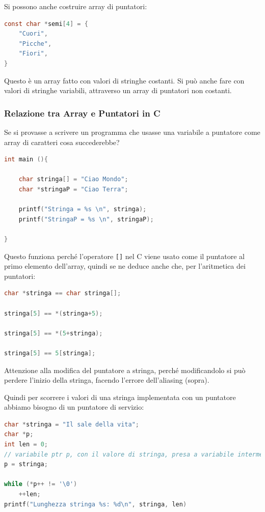 \documentclass[
  paper=a4,
  oneside  ,captions=tableheading
]{scrbook}
\newcommand{\passthrough}[1]{#1}
\begin{document}
Si possono anche costruire array di puntatori:

\begin{lstlisting}[language=C]
const char *semi[4] = {
    "Cuori",
    "Picche",
    "Fiori",
}
\end{lstlisting}

Questo è un array fatto con valori di stringhe costanti. Si può anche
fare con valori di stringhe variabili, attraverso un array di puntatori
non costanti.

\hypertarget{relazione-tra-array-e-puntatori-in-c}{%
\subsubsection{Relazione tra Array e Puntatori in
C}\label{relazione-tra-array-e-puntatori-in-c}}

Se si provasse a scrivere un programma che usasse una variabile a
puntatore come array di caratteri cosa succederebbe?

\begin{lstlisting}[language=C]
int main (){
    
    char stringa[] = "Ciao Mondo";
    char *stringaP = "Ciao Terra";
    
    printf("Stringa = %s \n", stringa);
    printf("StringaP = %s \n", stringaP);
    
}
\end{lstlisting}

Questo funziona perché l'operatore \passthrough{\lstinline![]!} nel C
viene usato come il puntatore al primo elemento dell'array, quindi se ne
deduce anche che, per l'aritmetica dei puntatori:

\begin{lstlisting}[language=C]
char *stringa == char stringa[];

stringa[5] == *(stringa+5);

stringa[5] == *(5+stringa);

stringa[5] == 5[stringa];
\end{lstlisting}

Attenzione alla modifica del puntatore a stringa, perché modificandolo
si può perdere l'inizio della stringa, facendo l'errore dell'aliasing
(sopra).

Quindi per scorrere i valori di una stringa implementata con un
puntatore abbiamo bisogno di un puntatore di servizio:

\begin{lstlisting}[language=C]
char *stringa = "Il sale della vita";
char *p;
int len = 0;
// variabile ptr p, con il valore di stringa, presa a variabile intermedia.
p = stringa;

while (*p++ != '\0')
    ++len;
printf("Lunghezza stringa %s: %d\n", stringa, len)
\end{lstlisting}
\end{document}
